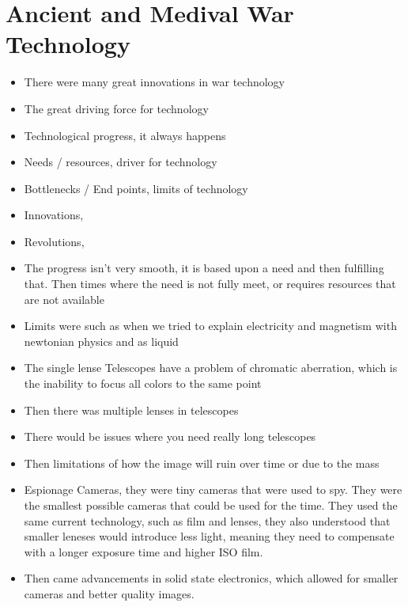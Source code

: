 \documentclass{article}
\begin{document}
\section{Ancient and Medival War Technology}
\begin{itemize}
  \item There were many great innovations in war technology
  \item The great driving force for technology
  \item Technological progress, it always happens
  \item Needs / resources, driver for technology
  \item Bottlenecks / End points, limits of technology
  \item Innovations,
  \item Revolutions,
  \item The progress isn't very smooth,
    it is based upon a need and then fulfilling that.
    Then times where the need is not fully meet,
    or requires resources that are not available
  \item Limits were such as when we tried to explain electricity and magnetism
    with newtonian physics and as liquid
  \item The single lense Telescopes have a problem of chromatic aberration,
    which is the inability to focus all colors to the same point
  \item Then there was multiple lenses in telescopes
  \item There would be issues where you need really long telescopes
  \item Then limitations of how the image will ruin over time or
    due to the mass
  \item Espionage Cameras, they were tiny cameras that were used to spy.
    They were the smallest possible cameras that could be used for the time.
    They used the same current technology, such as film and lenses,
    they also understood that smaller leneses would introduce less light,
    meaning they need to compensate with a longer exposure time and higher ISO film.
  \item Then came advancements in solid state electronics,
    which allowed for smaller cameras and better quality images.
\end{itemize}
\end{document}
